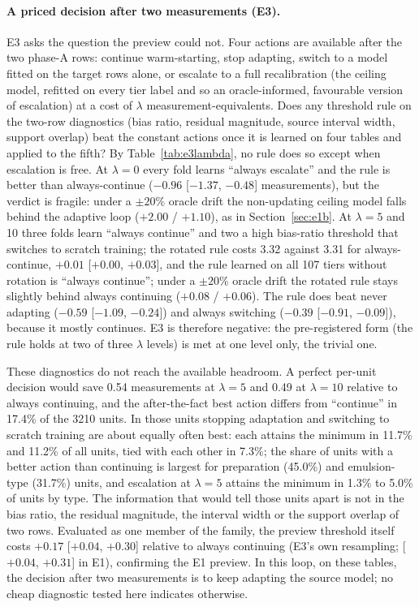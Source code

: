 \documentclass[11pt,a4paper]{article}
\begin{document}
\paragraph{A priced decision after two measurements (E3).} E3 asks the question the preview could
not. Four actions are available after the two phase-A rows: continue warm-starting, stop
adapting, switch to a model fitted on the target rows alone, or escalate to a full
recalibration (the ceiling model, refitted on every tier label and so an oracle-informed, favourable
version of escalation) at a cost of $\lambda$ measurement-equivalents. Does any threshold
rule on the two-row diagnostics (bias ratio, residual magnitude, source interval width, support
overlap) beat the constant actions once it is learned on four tables and applied to the fifth?
By Table~\ref{tab:e3lambda}, no rule does so except when escalation is free. At $\lambda = 0$ every fold learns
``always escalate'' and the rule is better than always-continue ($-0.96$ [$-1.37$, $-0.48$]
measurements), but the verdict is fragile: under a $\pm 20\%$ oracle drift the non-updating ceiling
model falls behind the adaptive loop ($+2.00$ / $+1.10$), as in
Section~\ref{sec:e1b}. At $\lambda = 5$ and 10 three folds learn ``always continue'' and two a high
bias-ratio threshold that switches to scratch training; the rotated rule costs 3.32
against 3.31 for always-continue, $+0.01$ [$+0.00$, $+0.03$], and the rule
learned on all 107 tiers without rotation is ``always continue''; under a
$\pm 20\%$ oracle drift the rotated rule stays slightly behind always continuing
($+0.08$ / $+0.06$). The rule does beat never
adapting ($-0.59$ [$-1.09$, $-0.24$]) and always switching ($-0.39$
[$-0.91$, $-0.09$]), because it mostly continues. E3 is therefore negative: the pre-registered
form (the rule holds at two of three $\lambda$ levels) is met at one level only, the trivial one.

These diagnostics do not reach the available headroom. A perfect per-unit decision would
save 0.54 measurements at $\lambda = 5$ and 0.49 at $\lambda = 10$ relative to always
continuing, and the after-the-fact best action differs from ``continue'' in 17.4\% of
the 3210 units. In those units stopping adaptation and switching to scratch training are about
equally often best: each attains the minimum in 11.7\% and 11.2\% of all units, tied with
each other in 7.3\%; the share of units with a better action than continuing is largest for
preparation (45.0\%) and emulsion-type (31.7\%) units, and escalation at $\lambda = 5$ attains
the minimum in 1.3\% to 5.0\% of units by type. The information that would tell those units apart is not in the bias ratio, the residual
magnitude, the interval width or the support overlap of two rows. Evaluated as one member of the
family, the preview threshold itself costs $+0.17$ [$+0.04$, $+0.30$] relative to always
continuing (E3's own resampling; [$+0.04$, $+0.31$] in E1), confirming the E1 preview. In this loop, on these tables, the decision after two
measurements is to keep adapting the source model; no cheap diagnostic tested here indicates
otherwise.
\end{document}
